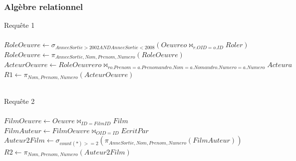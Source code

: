 \documentclass[10pt,a4paper]{article}
\begin{document}
\subsubsection{Algèbre relationnel}
\begin{list}{*}{}
\item Requête 1
\\ \\
$
RoleOeuvre \leftarrow \sigma_{ AnneeSortie > 2002 AND AnneeSortie < 2008  } ( Oeuvre o \bowtie_{ r.OID = o.ID  } Role r) 
$\\$
RoleOeuvre \leftarrow \pi_{AnneeSortie, Nom, Prenom, Numero}(RoleOeuvre) $
\\$
ActeurOeuvre \leftarrow RoleOeuvre ro \bowtie_{ro.Prenom = a.Prenom and ro.Nom = a. Nom and ro.Numero = a.Numero} Acteur a $
\\
$R1 \leftarrow \pi_{Nom, Prenom, Numero}(ActeurOeuvre)$
\\
\\
\item Requête 2
\\ \\ 
$ FilmOeuvre \leftarrow Oeuvre \bowtie_{ID = FilmID} Film$ \\ 
$FilmAuteur \leftarrow FilmOeuvre \bowtie_{OID = ID} EcritPar$ \\
$Auteur2Film \leftarrow \sigma_{count(*)>=2}(\pi_{AnneSortie, Nom, Prenom, Numero} (FilmAuteur) )$\\
$R2 \leftarrow \pi_{Nom, Prenom, Numero} (Auteur2Film)$
\\
\\


\end{list}
\end{document}

